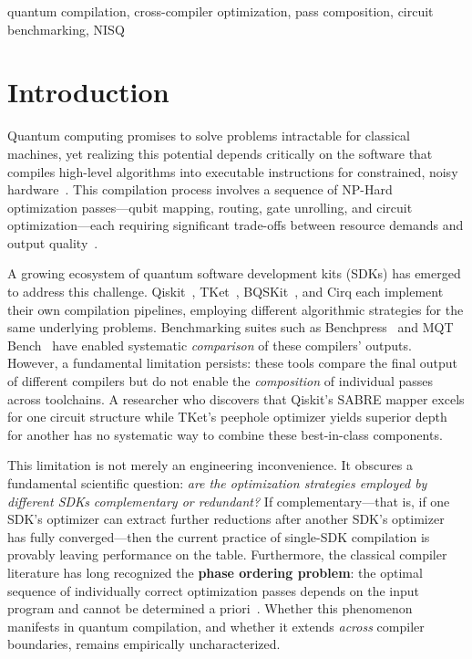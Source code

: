 \documentclass[conference]{IEEEtran}
\begin{document}
\begin{abstract}
\end{abstract}

\begin{IEEEkeywords}
quantum compilation, cross-compiler optimization, pass composition, circuit benchmarking, NISQ
\end{IEEEkeywords}

\section{Introduction}
\label{sec:introduction}

Quantum computing promises to solve problems intractable for classical machines, yet realizing this potential depends critically on the software that compiles high-level algorithms into executable instructions for constrained, noisy hardware~\cite{preskill2018quantum}.
This compilation process involves a sequence of NP-Hard optimization passes---qubit mapping, routing, gate unrolling, and circuit optimization---each requiring significant trade-offs between resource demands and output quality~\cite{siraichi2018qubit}.

A growing ecosystem of quantum software development kits (SDKs) has emerged to address this challenge.
Qiskit~\cite{qiskit}, TKet~\cite{sivarajah2020tket}, BQSKit~\cite{patel2022bqskit}, and Cirq each implement their own compilation pipelines, employing different algorithmic strategies for the same underlying problems.
Benchmarking suites such as Benchpress~\cite{benchpress} and MQT Bench~\cite{quetschlich2023mqtbench} have enabled systematic \textit{comparison} of these compilers' outputs.
However, a fundamental limitation persists: these tools compare the final output of different compilers but do not enable the \textit{composition} of individual passes across toolchains.
A researcher who discovers that Qiskit's SABRE mapper excels for one circuit structure while TKet's peephole optimizer yields superior depth for another has no systematic way to combine these best-in-class components.

This limitation is not merely an engineering inconvenience.
It obscures a fundamental scientific question: \textit{are the optimization strategies employed by different SDKs complementary or redundant?}
If complementary---that is, if one SDK's optimizer can extract further reductions after another SDK's optimizer has fully converged---then the current practice of single-SDK compilation is provably leaving performance on the table.
Furthermore, the classical compiler literature has long recognized the \textbf{phase ordering problem}: the optimal sequence of individually correct optimization passes depends on the input program and cannot be determined a priori~\cite{click1995combining}.
Whether this phenomenon manifests in quantum compilation, and whether it extends \textit{across} compiler boundaries, remains empirically uncharacterized.
\end{document}
